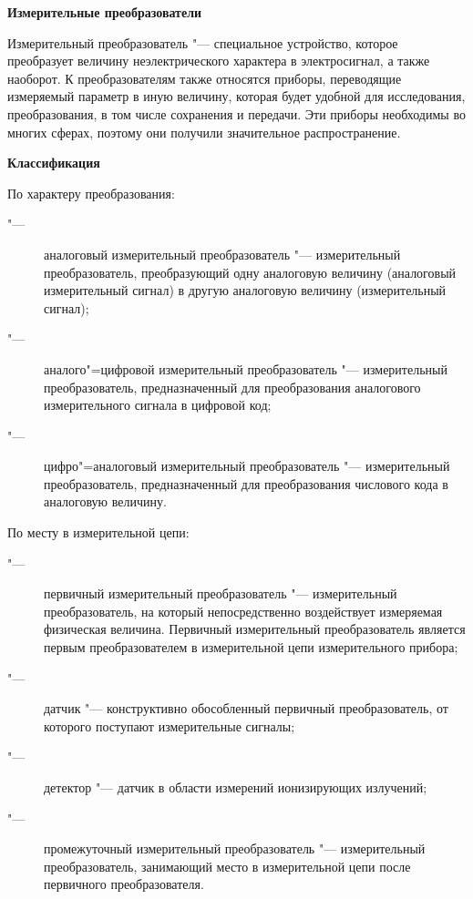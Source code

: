 \documentclass{article}
\begin{document}
\begin{center}\textbf{\LARGE Измерительные преобразователи}\end{center}
\vspace{0.5cm}

Измерительный преобразователь "--- специальное устройство, которое преобразует
величину неэлектрического характера в электросигнал, а также наоборот. К
преобразователям также относятся приборы, переводящие измеряемый параметр в иную
величину, которая будет удобной для исследования, преобразования, в том числе
сохранения и передачи. Эти приборы необходимы во многих сферах, поэтому они
получили значительное распространение.
\vspace{1cm}
\begin{center}\textbf{\Large Классификация}\end{center}
\vspace{0.5cm}

По характеру преобразования:
\begin{description}
  \item["---] аналоговый измерительный преобразователь "--- измерительный
    преобразователь, преобразующий одну аналоговую величину (аналоговый
    измерительный сигнал) в другую аналоговую величину (измерительный сигнал);
  \item["---] аналого"=цифровой измерительный преобразователь "--- измерительный
    преобразователь, предназначенный для преобразования аналогового
    измерительного сигнала в цифровой код;
  \item["---] цифро"=аналоговый измерительный преобразователь "--- измерительный
    преобразователь, предназначенный для преобразования числового кода в
    аналоговую величину.
\end{description}

\vspace{1cm}
По месту в измерительной цепи:
\begin{description}
  \item["---] первичный измерительный преобразователь "--- измерительный
    преобразователь, на который непосредственно воздействует измеряемая
    физическая величина. Первичный измерительный преобразователь является первым
    преобразователем в измерительной цепи измерительного прибора;
  \item["---] датчик "--- конструктивно обособленный первичный преобразователь,
    от которого поступают измерительные сигналы;
  \item["---] детектор "--- датчик в области измерений ионизирующих излучений;
  \item["---] промежуточный измерительный преобразователь "--- измерительный
    преобразователь, занимающий место в измерительной цепи после первичного
    преобразователя.
\end{description}
\end{document}
